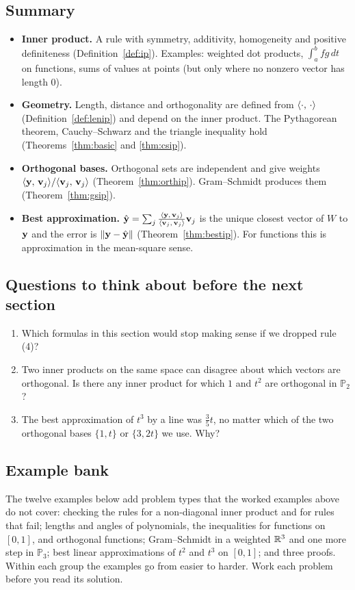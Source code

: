 \documentclass[11pt]{article}
\begin{document}
\subsection*{Summary}
\begin{itemize}
  \item \textbf{Inner product.} A rule with symmetry, additivity, homogeneity and positive definiteness (Definition~\ref{def:ip}). Examples: weighted dot products, $\int_a^bf g\,dt$ on functions, sums of values at points (but only where no nonzero vector has length $0$).
  \item \textbf{Geometry.} Length, distance and orthogonality are defined from $\langle \cdot,\,\cdot\rangle$ (Definition~\ref{def:lenip}) and depend on the inner product. The Pythagorean theorem, Cauchy--Schwarz and the triangle inequality hold (Theorems~\ref{thm:basic} and \ref{thm:csip}).
  \item \textbf{Orthogonal bases.} Orthogonal sets are independent and give weights $\langle \mathbf{y},\,\mathbf{v}_j\rangle/\langle \mathbf{v}_j,\,\mathbf{v}_j\rangle$ (Theorem~\ref{thm:orthip}). Gram--Schmidt produces them (Theorem~\ref{thm:gsip}).
  \item \textbf{Best approximation.} $\hat{\mathbf{y}}=\sum_j\frac{\langle \mathbf{y},\,\mathbf{v}_j\rangle}{\langle \mathbf{v}_j,\,\mathbf{v}_j\rangle}\mathbf{v}_j$ is the unique closest vector of $W$ to $\mathbf{y}$ and the error is $\lVert\mathbf{y}-\hat{\mathbf{y}}\rVert$ (Theorem~\ref{thm:bestip}). For functions this is approximation in the mean-square sense.
\end{itemize}

\subsection*{Questions to think about before the next section}
\begin{enumerate}[nosep]
  \item Which formulas in this section would stop making sense if we dropped rule (4)?
  \item Two inner products on the same space can disagree about which vectors are orthogonal. Is there any inner product for which $1$ and $t^2$ are orthogonal in $\mathbb{P}_2$?
  \item The best approximation of $t^3$ by a line was $\tfrac35t$, no matter which of the two orthogonal bases $\{1,t\}$ or $\{3,2t\}$ we use. Why?
\end{enumerate}

\subsection*{Example bank}
The twelve examples below add problem types that the worked examples above do not cover: checking the rules for a non-diagonal inner product and for rules that fail; lengths and angles of polynomials, the inequalities for functions on $[0,1]$, and orthogonal functions; Gram--Schmidt in a weighted $\mathbb{R}^3$ and one more step in $\mathbb{P}_3$; best linear approximations of $t^2$ and $t^3$ on $[0,1]$; and three proofs. Within each group the examples go from easier to harder. Work each problem before you read its solution.
\end{document}
